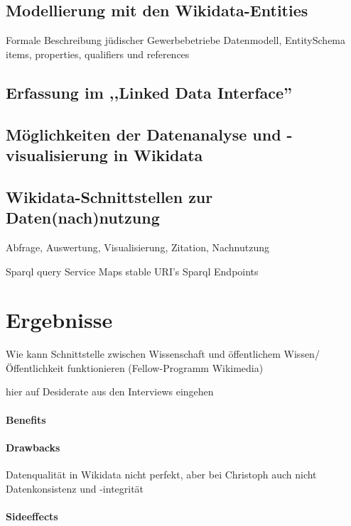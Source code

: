 \subsection{Modellierung mit den Wikidata-Entities}
Formale Beschreibung jüdischer Gewerbebetriebe Datenmodell, 
EntitySchema items, properties, qualifiers und references
\subsection{Erfassung im ,,Linked Data Interface''}

\subsection{Möglichkeiten der Datenanalyse und -visualisierung in Wikidata}

\subsection{Wikidata-Schnittstellen zur Daten(nach)nutzung}

Abfrage, Auswertung, Visualisierung, Zitation, Nachnutzung

Sparql query Service
Maps
stable URI's
Sparql Endpoints

\section{Ergebnisse}

Wie kann Schnittstelle zwischen Wissenschaft und öffentlichem Wissen/ Öffentlichkeit funktionieren (Fellow-Programm Wikimedia)

hier auf Desiderate aus den Interviews eingehen

\paragraph{Benefits}

\paragraph{Drawbacks}

Datenqualität in Wikidata nicht perfekt, aber bei Christoph auch nicht
Datenkonsistenz und -integrität

\paragraph{Sideeffects}

